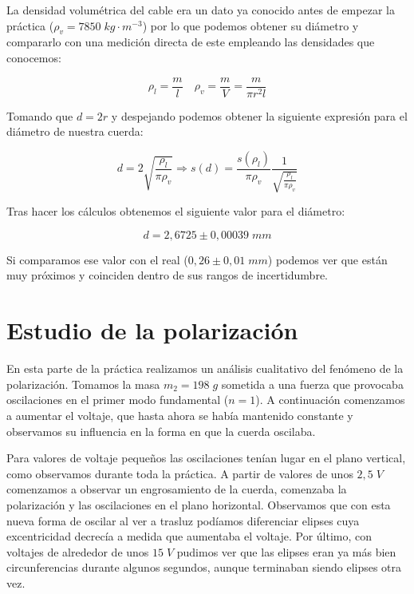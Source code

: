 \documentclass[a4paper,12pt,titlepage]{article}
\begin{document}
La densidad volumétrica del cable era un dato ya conocido antes de empezar la práctica ($\rho_v = 7850 \; kg\cdot m^{-3}$) por lo que podemos obtener su diámetro y compararlo con una medición directa de este empleando las densidades que conocemos:

\begin{equation}
    \rho_l = \frac{m}{l} \quad \rho_v = \frac{m}{V} = \frac{m}{\pi r^2 l}
\end{equation}

Tomando que $d=2r$ y despejando podemos obtener la siguiente expresión para el diámetro de nuestra cuerda:

\begin{equation}
    d = 2\sqrt{\frac{\rho_l}{\pi \rho_v}} \Rightarrow s(d)=\frac{s(\rho_l)}{\pi \rho_v}\frac{1}{\sqrt{\frac{\rho_l}{\pi \rho_v}}}
\end{equation}

Tras hacer los cálculos obtenemos el siguiente valor para el diámetro:

\begin{equation}
    d = 2,6725 \pm 0,00039 \;mm
\end{equation}

Si comparamos ese valor con el real ($0,26\pm 0,01 \;mm$) podemos ver que están muy próximos y coinciden dentro de sus rangos de incertidumbre.

\newpage

\section{Estudio de la polarización}

En esta parte de la práctica realizamos un análisis cualitativo del fenómeno de la polarización. Tomamos la masa $m_2=198\;g$ sometida a una fuerza que provocaba oscilaciones en el primer modo fundamental ($n=1$). A continuación comenzamos a aumentar el voltaje, que hasta ahora se había mantenido constante y observamos su influencia en la forma en que la cuerda oscilaba. 

\par Para valores de voltaje pequeños las oscilaciones tenían lugar en el plano vertical, como observamos durante toda la práctica. A partir de valores de unos $2,5\;V$ comenzamos a observar un engrosamiento de la cuerda, comenzaba la polarización y las oscilaciones en el plano horizontal. Observamos que con esta nueva forma de oscilar al ver a trasluz podíamos diferenciar elipses cuya excentricidad decrecía a medida que aumentaba el voltaje. Por último, con voltajes de alrededor de unos $15\;V$ pudimos ver que las elipses eran ya más bien circunferencias durante algunos segundos, aunque terminaban siendo elipses otra vez. 
\end{document}
